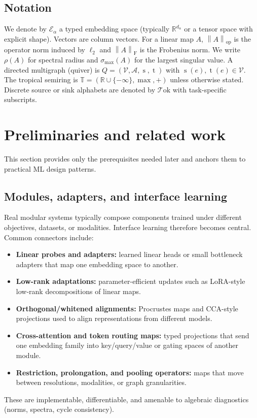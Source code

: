 \documentclass[11pt]{article}
\theoremstyle{definition}
\theoremstyle{plain}
\theoremstyle{remark}
\newcommand{\R}{\mathbb{R}}
\newcommand{\opnorm}[1]{\left\lVert #1 \right\rVert_{\mathrm{op}}}
\newcommand{\Frob}[1]{\left\lVert #1 \right\rVert_{\mathrm{F}}}
\newcommand{\mc}[1]{\mathcal{#1}}
\newcommand{\Emb}{\mc{E}}
\newcommand{\Tok}{\mc{T}\mathrm{ok}}
\newcommand{\Nodes}{\mc{V}}
\newcommand{\Edges}{\mc{A}}
\newcommand{\src}{\operatorname{s}}
\newcommand{\tgt}{\operatorname{t}}
\newcommand{\Trop}{\mathbb{T}}
\begin{document}
\subsection{Notation}
We denote by $\Emb_\alpha$ a typed embedding space (typically $\R^{d_\alpha}$ or a tensor space with explicit shape).
Vectors are column vectors.
For a linear map $A$, $\opnorm{A}$ is the operator norm induced by $\ell_2$ and $\Frob{A}$ is the Frobenius norm.
We write $\rho(A)$ for spectral radius and $\sigma_{\max}(A)$ for the largest singular value.
A directed multigraph (quiver) is $Q=(\Nodes,\Edges,\src,\tgt)$ with $\src(e),\tgt(e)\in\Nodes$.
The tropical semiring is $\Trop=(\R\cup\{-\infty\},\max,+)$ unless otherwise stated.
Discrete source or sink alphabets are denoted by $\Tok$ with task-specific subscripts.

\newpage

\section{Preliminaries and related work}
\label{sec:related}

This section provides only the prerequisites needed later and anchors them to practical ML design patterns.

\subsection{Modules, adapters, and interface learning}
Real modular systems typically compose components trained under different objectives, datasets, or modalities.
Interface learning therefore becomes central.
Common connectors include:
\begin{itemize}[leftmargin=2em]
\item \textbf{Linear probes and adapters:} learned linear heads or small bottleneck adapters that map one embedding space to another.
\item \textbf{Low-rank adaptations:} parameter-efficient updates such as LoRA-style low-rank decompositions of linear maps.
\item \textbf{Orthogonal/whitened alignments:} Procrustes maps and CCA-style projections used to align representations from different models.
\item \textbf{Cross-attention and token routing maps:} typed projections that send one embedding family into key/query/value or gating spaces of another module.
\item \textbf{Restriction, prolongation, and pooling operators:} maps that move between resolutions, modalities, or graph granularities.
\end{itemize}
These are implementable, differentiable, and amenable to algebraic diagnostics (norms, spectra, cycle consistency).
\end{document}
